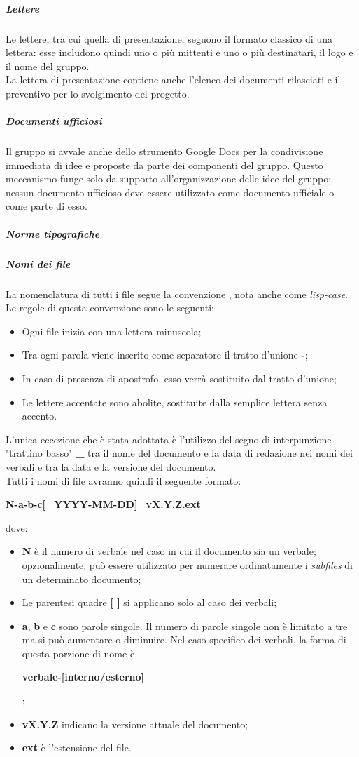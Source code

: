 \documentclass[../norme-di-progetto.tex]{subfiles}
\begin{document}
\subparagraph*{Lettere}
Le lettere, tra cui quella di presentazione, seguono il formato classico di una lettera: esse includono quindi uno o più mittenti e uno o più destinatari, il logo e il nome del gruppo. \\
La lettera di presentazione contiene anche l'elenco dei documenti rilasciati e il preventivo per lo svolgimento del progetto.

\subparagraph*{Documenti ufficiosi}
Il gruppo si avvale anche dello strumento Google Docs per la condivisione immediata di idee e proposte da parte dei componenti del gruppo. Questo meccanismo funge solo da supporto all'organizzazione delle idee del gruppo; nessun documento ufficioso deve essere utilizzato come documento ufficiale o come parte di esso.

\subparagraph{Norme tipografiche}
\subparagraph*{Nomi dei file}
La nomenclatura di tutti i file segue la convenzione , nota anche come \textit{lisp-case}. Le regole di questa convenzione sono le seguenti:
\begin{itemize}
  \item Ogni file inizia con una lettera minuscola;
  \item Tra ogni parola viene inserito come separatore il tratto d'unione \textbf{-};
  \item In caso di presenza di apostrofo, esso verrà sostituito dal tratto d'unione;
  \item Le lettere accentate sono abolite, sostituite dalla semplice lettera senza accento.
\end{itemize}
L'unica eccezione che è stata adottata è l'utilizzo del segno di interpunzione "trattino basso" \textbf{\_} tra il nome del documento e la data di redazione nei nomi dei verbali e tra la data e la versione del documento. \\
Tutti i nomi di file avranno quindi il seguente formato: \\ \begin{center}
  \centering
  \textbf{N-a-b-c[\_YYYY-MM-DD]\_vX.Y.Z.ext}
\end{center} dove:
\begin{itemize}
  \item \textbf{N} è il numero di verbale nel caso in cui il documento sia un verbale; opzionalmente, può essere utilizzato per numerare ordinatamente i \textit{subfiles} di un determinato documento;
  \item Le parentesi quadre \textbf{[ ]} si applicano solo al caso dei verbali;
  \item \textbf{a}, \textbf{b} e \textbf{c} sono parole singole. Il numero di parole singole non è limitato a tre ma si può aumentare o diminuire. Nel caso specifico dei verbali, la forma di questa porzione di nome è \\ \begin{center}
    \centering
    \textbf{verbale-[interno/esterno]}
  \end{center};
  \item \textbf{vX.Y.Z} indicano la versione attuale del documento;
  \item \textbf{ext} è l'estensione del file.
\end{itemize}
\end{document}

